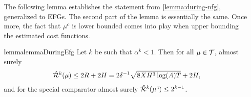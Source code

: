 The following lemma establishes the statement from \cref{lemma:during-nfg}, generalized to EFGs. The second part of the lemma is essentially the same. Once more, the fact that $\mu^c$ is lower bounded comes into play when upper bounding the estimated cost functions.

\begin{restatable}{lemma}{lemmaDuringEfg} \label{lemma:during-efg}
    Let $k$ be such that $\alpha^k<1$. Then for all $\mu\in\mathcal{T}$, almost surely
    \begin{align*}
        \hat{\mathcal{R}}^k(\mu) \leq 2R+2H=2\delta^{-1}\sqrt{8XH^3\log(A) T}+2H,
    \end{align*}
    and for the special comparator almost surely $\hat{\mathcal{R}}^k(\mu^c) \leq 2^{k-1}$.
\end{restatable}

